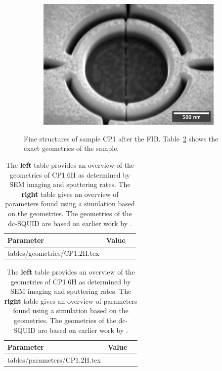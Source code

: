 \begin{figure}[ht!]
\begin{subfigure}[t]{0.3\textwidth}
	\end{subfigure}
	\hfill
	\begin{subfigure}[t]{0.3\textwidth}
		\centering
		\includegraphics[width=\textwidth]{figures/samples/CP1/CP1.2H_SEM_SQUID.jpg}
	\end{subfigure}

	\caption{Fine structures of sample CP1 after the FIB. Table~\ref{tab:CP1.6H-geometries} shows the exact geometries of the sample.}
	\label{fig:CP1.2H-SEM-images}
\end{figure}

\begin{table}
	\begin{subtable}{.6\linewidth}
		\begin{tabular}[t]{@{}lrr@{}}
			\toprule
			Parameter & Value \\ \midrule
			\expandableinput tables/geometries/CP1.2H.tex
			\bottomrule
		\end{tabular}
    \end{subtable}
    \hfill
    \begin{subtable}{.3\linewidth}
    	\flushright
    	\begin{tabular}[t]{@{}lrr@{}}
    		\toprule
    		Parameter & Value \\ \midrule
    		\expandableinput tables/parameters/CP1.2H.tex
    		\bottomrule
    	\end{tabular}
    \end{subtable}
    \caption{The \textbf{left} table provides an overview of the geometries of CP1.6H as determined by SEM imaging and sputtering rates. The \textbf{right} table gives an overview of parameters found using a simulation based on the geometries. The geometries of the dc-SQUID are based on earlier work by \citeauthor{rogSQUIDontipMagneticMicroscopy2022} \citeyear{rogSQUIDontipMagneticMicroscopy2022}.}
    \label{tab:CP1.6H-geometries}
\end{table}